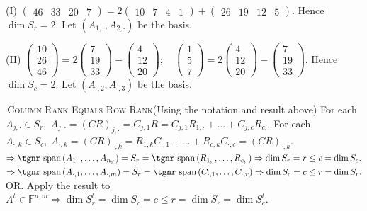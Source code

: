 \documentclass[a4paper, 11pt, UTF8]{article}
\def\Spn{{\textup{\tgnr span}}\,}
\def\Fbb{{\mathbb{F}}}
\def\BulletPoint{{\small\bullet}}
\def\EndI{\hspace{-4.3pt}}
\def\Or{{\large O{\footnotesize R.} }}
\begin{document}
\begin{large}
(I) {\normalsize$\begin{pmatrix} 46 & 33 & 20 & 7 \end{pmatrix}=2\begin{pmatrix} 10 & 7 & 4 & 1\end{pmatrix}+\begin{pmatrix} 26 & 19 & 12 & 5\end{pmatrix}$}.
Hence $\dim S_r=2$. Let $(A_{1,\cdot},A_{2,\cdot})$ be the basis.\par\vspace{6pt}\quad\EndI
(II) {\normalsize$\begin{pmatrix} 10\\ 26\\ 46\end{pmatrix}=2\begin{pmatrix} 7\\ 19\\ 33\end{pmatrix}-\begin{pmatrix} 4\\ 12\\ 20\end{pmatrix}; \quad \begin{pmatrix} 1\\ 5\\ 7\end{pmatrix}=2\begin{pmatrix} 4\\ 12\\ 20\end{pmatrix}-\begin{pmatrix} 7\\ 19\\ 33\end{pmatrix}$}. Hence $\dim S_c=2.$ Let $(A_{\cdot,2},A_{\cdot,3})$ be the basis.\vspace{6pt}\par
\SepLine
\pagebreak

\BulletPoint \,\hspace{1pt}\textsc{Column Rank Equals Row Rank}\quad (Using the notation and result above)\TextB{}
For each $A_{j,\cdot}\in S_r,\;A_{j,\cdot}=(CR)_{j,\cdot}=C_{j,1}R=C_{j,1}R_{1,\cdot}+\dots+C_{j,c}R_{c,\cdot}$\TextB{}
For each $A_{\cdot,k}\in S_c,\;A_{\cdot,k}=(CR)_{\cdot,k}=R_{1,k}C_{\cdot,1}+\dots+R_{c,k}C_{\cdot,c}=(CR)_{\cdot,k}.$\TextB{}
$\Rightarrow\Spn(A_{1,\cdot},\dots,A_{n,\cdot})=S_r=\Spn(R_{1,\cdot},\dots,R_{c,\cdot})\Rightarrow\dim S_r=r\leq c=\dim S_c.$\TextB{}
$\Rightarrow\Spn(A_{\cdot,1},\dots,A_{\cdot,m})=S_r=\Spn(C_{\cdot,1},\dots,C_{\cdot,r})\Rightarrow\dim S_c=c\leq r=\dim S_r.$\TextB{}
\Or Apply the result to $A^t\in\Fbb^{n,m}\Rightarrow\dim S_r^t=\dim S_c=c\leq r=\dim S_r=\dim S_c^t.$\PfEnd
\SepLine



\end{large}
\end{document}

